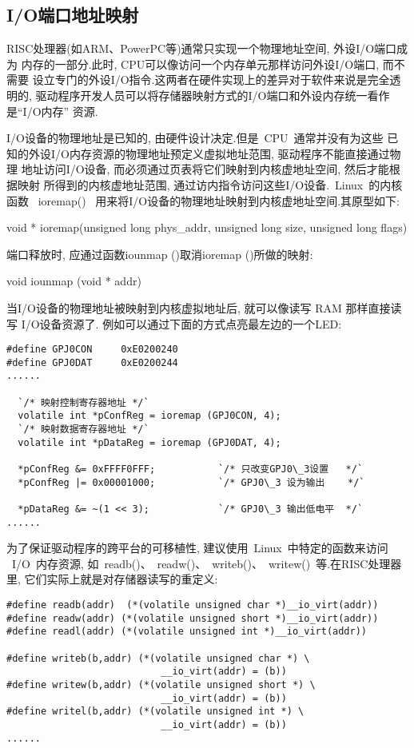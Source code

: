 \subsection{I/O端口地址映射}
	RISC处理器(如ARM、PowerPC等)通常只实现一个物理地址空间, 外设I/O端口成为
内存的一部分.此时, CPU可以像访问一个内存单元那样访问外设I/O端口, 而不需要
设立专门的外设I/O指令.这两者在硬件实现上的差异对于软件来说是完全透明的, 
驱动程序开发人员可以将存储器映射方式的I/O端口和外设内存统一看作是``I/O内存''
资源.

	I/O设备的物理地址是已知的, 由硬件设计决定.但是~CPU~通常并没有为这些
已知的外设I/O内存资源的物理地址预定义虚拟地址范围, 驱动程序不能直接通过物理
地址访问I/O设备, 而必须通过页表将它们映射到内核虚地址空间, 然后才能根据映射
所得到的内核虚地址范围, 通过访内指令访问这些I/O设备.~Linux~的内核函数
~ioremap()~ 用来将I/O设备的物理地址映射到内核虚地址空间.其原型如下:

	void * ioremap(unsigned long phys\_addr, unsigned long size, unsigned long
flags)

	端口释放时, 应通过函数iounmap ()取消ioremap ()所做的映射:

	void iounmap (void * addr)

	当I/O设备的物理地址被映射到内核虚拟地址后, 就可以像读写 RAM 那样直接读写
I/O设备资源了. 例如可以通过下面的方式点亮最左边的一个LED:\@

\lstset{language=c,escapeinside=``}
\begin{lstlisting}[frame=trBL]
#define	GPJ0CON		0xE0200240
#define	GPJ0DAT		0xE0200244
......

  `/* 映射控制寄存器地址 */`
  volatile int *pConfReg = ioremap (GPJ0CON, 4);
  `/* 映射数据寄存器地址 */`
  volatile int *pDataReg = ioremap (GPJ0DAT, 4);

  *pConfReg &= 0xFFFF0FFF;           `/* 只改变GPJ0\_3设置   */`
  *pConfReg |= 0x00001000;           `/* GPJ0\_3 设为输出    */`

  *pDataReg &= ~(1 << 3);            `/* GPJ0\_3 输出低电平  */`
......
\end{lstlisting}
	
	为了保证驱动程序的跨平台的可移植性, 建议使用~Linux~中特定的函数来访问
~I/O~内存资源, 如~readb()、~readw()、~writeb()、~writew()~等.在RISC处理器里, 
它们实际上就是对存储器读写的重定义:

\begin{lstlisting}[frame=trBL]
#define readb(addr)  (*(volatile unsigned char *)__io_virt(addr))
#define readw(addr) (*(volatile unsigned short *)__io_virt(addr))
#define readl(addr) (*(volatile unsigned int *)__io_virt(addr))

#define writeb(b,addr) (*(volatile unsigned char *) \
                           __io_virt(addr) = (b))
#define writew(b,addr) (*(volatile unsigned short *) \
                           __io_virt(addr) = (b))
#define writel(b,addr) (*(volatile unsigned int *) \
                           __io_virt(addr) = (b))
......
\end{lstlisting}

